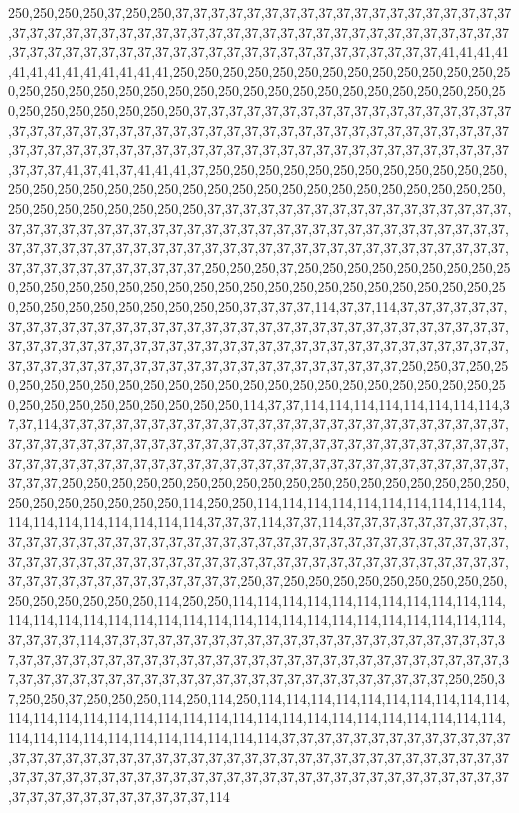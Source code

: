 250,250,250,250,37,250,250,37,37,37,37,37,37,37,37,37,37,37,37,37,37,37,37,37,37,37,37,37,37,37,37,37,37,37,37,37,37,37,37,37,37,37,37,37,37,37,37,37,37,37,37,37,37,37,37,37,37,37,37,37,37,37,37,37,37,37,37,37,37,37,37,37,37,37,37,37,37,37,41,41,41,41,41,41,41,41,41,41,41,41,41,250,250,250,250,250,250,250,250,250,250,250,250,250,250,250,250,250,250,250,250,250,250,250,250,250,250,250,250,250,250,250,250,250,250,250,250,250,250,250,250,250,37,37,37,37,37,37,37,37,37,37,37,37,37,37,37,37,37,37,37,37,37,37,37,37,37,37,37,37,37,37,37,37,37,37,37,37,37,37,37,37,37,37,37,37,37,37,37,37,37,37,37,37,37,37,37,37,37,37,37,37,37,37,37,37,37,37,37,37,37,37,37,37,37,37,37,37,37,41,37,41,37,41,41,41,37,250,250,250,250,250,250,250,250,250,250,250,250,250,250,250,250,250,250,250,250,250,250,250,250,250,250,250,250,250,250,250,250,250,250,250,250,250,250,250,250,37,37,37,37,37,37,37,37,37,37,37,37,37,37,37,37,37,37,37,37,37,37,37,37,37,37,37,37,37,37,37,37,37,37,37,37,37,37,37,37,37,37,37,37,37,37,37,37,37,37,37,37,37,37,37,37,37,37,37,37,37,37,37,37,37,37,37,37,37,37,37,37,37,37,37,37,37,37,37,37,37,37,37,37,250,250,250,37,250,250,250,250,250,250,250,250,250,250,250,250,250,250,250,250,250,250,250,250,250,250,250,250,250,250,250,250,250,250,250,250,250,250,250,250,250,250,37,37,37,37,114,37,37,114,37,37,37,37,37,37,37,37,37,37,37,37,37,37,37,37,37,37,37,37,37,37,37,37,37,37,37,37,37,37,37,37,37,37,37,37,37,37,37,37,37,37,37,37,37,37,37,37,37,37,37,37,37,37,37,37,37,37,37,37,37,37,37,37,37,37,37,37,37,37,37,37,37,37,37,37,37,37,37,37,37,37,37,37,250,250,37,250,250,250,250,250,250,250,250,250,250,250,250,250,250,250,250,250,250,250,250,250,250,250,250,250,250,250,250,250,250,250,114,37,37,114,114,114,114,114,114,114,114,37,37,114,37,37,37,37,37,37,37,37,37,37,37,37,37,37,37,37,37,37,37,37,37,37,37,37,37,37,37,37,37,37,37,37,37,37,37,37,37,37,37,37,37,37,37,37,37,37,37,37,37,37,37,37,37,37,37,37,37,37,37,37,37,37,37,37,37,37,37,37,37,37,37,37,37,37,37,37,37,37,37,37,37,37,37,37,250,250,250,250,250,250,250,250,250,250,250,250,250,250,250,250,250,250,250,250,250,250,250,250,250,114,250,250,114,114,114,114,114,114,114,114,114,114,114,114,114,114,114,114,114,114,37,37,37,114,37,37,114,37,37,37,37,37,37,37,37,37,37,37,37,37,37,37,37,37,37,37,37,37,37,37,37,37,37,37,37,37,37,37,37,37,37,37,37,37,37,37,37,37,37,37,37,37,37,37,37,37,37,37,37,37,37,37,37,37,37,37,37,37,37,37,37,37,37,37,37,37,37,37,37,37,37,37,37,37,37,250,37,250,250,250,250,250,250,250,250,250,250,250,250,250,250,250,114,250,250,114,114,114,114,114,114,114,114,114,114,114,114,114,114,114,114,114,114,114,114,114,114,114,114,114,114,114,114,114,114,114,37,37,37,37,114,37,37,37,37,37,37,37,37,37,37,37,37,37,37,37,37,37,37,37,37,37,37,37,37,37,37,37,37,37,37,37,37,37,37,37,37,37,37,37,37,37,37,37,37,37,37,37,37,37,37,37,37,37,37,37,37,37,37,37,37,37,37,37,37,37,37,37,37,37,37,37,37,37,37,37,250,250,37,250,250,37,250,250,250,114,250,114,250,114,114,114,114,114,114,114,114,114,114,114,114,114,114,114,114,114,114,114,114,114,114,114,114,114,114,114,114,114,114,114,114,114,114,114,114,114,114,114,114,114,37,37,37,37,37,37,37,37,37,37,37,37,37,37,37,37,37,37,37,37,37,37,37,37,37,37,37,37,37,37,37,37,37,37,37,37,37,37,37,37,37,37,37,37,37,37,37,37,37,37,37,37,37,37,37,37,37,37,37,37,37,37,37,37,37,37,37,37,37,37,37,37,37,37,37,37,37,37,37,37,114